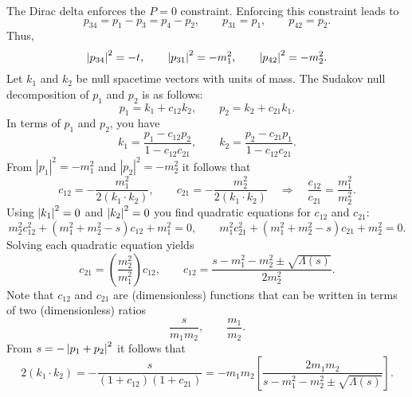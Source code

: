 The Dirac delta enforces the $P = 0$ constraint. Enforcing this constraint leads to
\begin{equation}
	p_{34} = p_{1} - p_{3} = p_{4} - p_{2}, \qquad p_{31} = p_{1}, \qquad p_{42} = p_{2}.
\end{equation}
Thus,
\begin{equation}
	\left\lvert p_{34} \right\rvert^{2} = -t, \qquad \left\lvert p_{31} \right\rvert^{2} = -m_{1}^{2}, \qquad \left\lvert p_{42} \right\rvert^{2} = -m_{2}^{2}.
\end{equation}
Let $k_{1}$ and $k_{2}$ be null spacetime vectors with units of mass. The Sudakov null decomposition of $p_{1}$ and $p_{2}$ is as follows:
\begin{equation}
	p_{1} = k_{1} + c_{12} k_{2}, \qquad p_{2} = k_{2} + c_{21} k_{1}.
\end{equation}
In terms of $p_{1}$ and $p_{2}$, you have
\begin{equation}
	k_{1} = \frac{p_{1} - c_{12} p_{2}}{1 - c_{12} c_{21}}, \qquad k_{2} = \frac{p_{2} - c_{21} p_{1}}{1 - c_{12} c_{21}}.
	\label{eq:k1_and_k2}
\end{equation}
From $|p_{1}|^{2} = -m_{1}^{2}$ and $|p_{2}|^{2} = -m_{2}^{2}$ it follows that
\begin{equation}
	c_{12} = - \frac{m_{1}^{2}}{2 (k_{1} \cdot k_{2})}, \qquad c_{21} = - \frac{m_{2}^{2}}{2 (k_{1} \cdot k_{2})} \quad \Longrightarrow \quad \frac{c_{12}}{c_{21}} = \frac{m_{1}^{2}}{m_{2}^{2}}.
\end{equation}
Using $\left\lvert k_{1} \right\rvert^{2} = 0$ and $\left\lvert k_{2} \right\rvert^{2} = 0$ you find quadratic equations for $c_{12}$ and $c_{21}$:
\begin{equation}
	m_{2}^{2} c_{12}^{2} + \left(m_{1}^{2} + m_{2}^{2} - s\right) c_{12} + m_{1}^{2} = 0, \qquad m_{1}^{2} c_{21}^{2} + \left(m_{1}^{2} + m_{2}^{2} - s\right) c_{21} + m_{2}^{2} = 0.
\end{equation}
Solving each quadratic equation yields
\begin{equation}
	c_{21} = \left( \frac{m_{2}^{2}}{m_{1}^{2}} \right) c_{12}, \qquad c_{12} = \frac{s - m_{1}^{2} - m_{2}^{2} \pm \sqrt{\Lambda(s)}}{2 m_{2}^{2}}.
\end{equation}
Note that $c_{12}$ and $c_{21}$ are (dimensionless) functions that can be written in terms of two (dimensionless) ratios
\begin{equation}
	\frac{s}{m_{1} m_{2}}, \qquad \frac{m_{1}}{m_{2}}.
\end{equation}
From $s = {-\left\lvert p_{1} + p_{2} \right\rvert^{2}}$ it follows that
\begin{equation}
	2 (k_{1} \cdot k_{2}) = - \frac{s}{(1 + c_{12})(1 + c_{21})} = -m_{1} m_{2} \left[ \frac{2 m_{1} m_{2}}{s - m_{1}^{2} - m_{2}^{2} \pm \sqrt{\Lambda(s)}} \right].
\end{equation}
